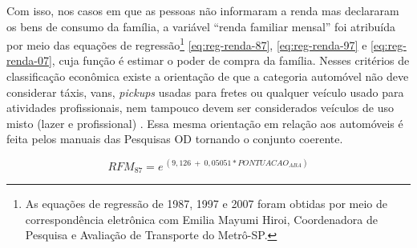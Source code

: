 \begin{quadro}[htb]
\end{quadro}

Com isso, nos casos em que as pessoas não informaram a renda mas declararam os bens de consumo da família, a  variável ``renda familiar mensal'' foi atribuída por meio das equações de regressão\footnote{As equações de regressão de 1987, 1997 e 2007 foram obtidas por meio de correspondência eletrônica com Emilia Mayumi Hiroi, Coordenadora de Pesquisa e Avaliação de Transporte do Metrô-SP.} 
\eqref{eq:reg-renda-87}, \eqref{eq:reg-renda-97} e \eqref{eq:reg-renda-07}, cuja função é estimar o poder de compra da família. Nesses critérios de classificação econômica existe a orientação de que a categoria automóvel não deve considerar táxis, vans, \emph{pickups} usadas para fretes ou qualquer veículo usado para atividades profissionais, nem tampouco devem ser considerados veículos de uso misto (lazer e profissional) \cite{CRITERIOBRASIL}. Essa mesma orientação em relação aos automóveis é feita pelos manuais das Pesquisas OD \cite{OD77, OD87, OD97, OD07} tornando o conjunto coerente.

\begin{equation}\label{eq:reg-renda-87}
RFM_{87} = e^{~(9,126~+~0,05051*PONTUACAO_{ABA})}
\end{equation}

